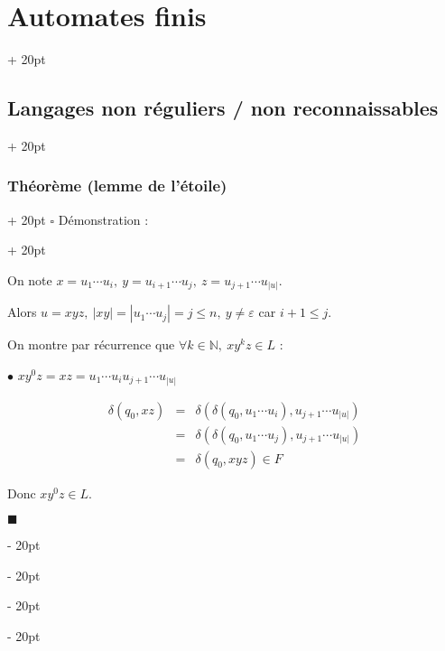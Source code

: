 \documentclass[a4paper, 12pt, twoside]{article}
\newcommand{\N}{\mathbb{N}} %
\newcommand{\abs}[1]{\left\lvert #1 \right\rvert}
\renewcommand{\le}{\leqslant}
\newcommand{\ind}[1][20pt]{\advance\leftskip + #1}
\newcommand{\deind}[1][20pt]{\advance\leftskip - #1}
\newenvironment{indt}[2][20pt]{#2 \par \ind[#1]}{\par \deind} %
\newenvironment{proof}[1][{Démonstration :}]{\begin{indt}{$\square$ #1}}{$\blacksquare$ \end{indt}}
\begin{document}
\begin{indt}{\section{Automates finis}}
\begin{indt}{\subsection{Langages non réguliers / non reconnaissables}}
\begin{indt}{\subsubsection{Théorème (lemme de l'étoile)}}
\begin{proof}
\begin{center}
                    \end{center}

                    On note $x = u_1 \cdots u_i,\ y = u_{i + 1} \cdots u_j,\ z = u_{j + 1} \cdots u_{\abs u}$.

                    Alors $u = xyz,\ \abs{xy} = \abs{u_1 \cdots u_j} = j \le n,\ y \neq \varepsilon$ car $i + 1 \le j$.

                    On montre par récurrence que $\forall k \in \N,\ xy^k z \in L$ :

                    \vspace{6pt}
                    
                    $\bullet$ $xy^0z = xz = u_1 \cdots u_i u_{j + 1} \cdots u_{\abs u}$

                    \[
                        \begin{array}{rcl}
                            \delta(q_0, xz)
                            &=& \delta(\delta(q_0, u_1 \cdots u_i), u_{j + 1} \cdots u_{\abs u})
                            \\
                            &=& \delta(\delta(q_0, u_1 \cdots u_j), u_{j + 1} \cdots u_{\abs u})
                            \\
                            &=& \delta(q_0, xyz) \in F
                        \end{array}
                    \]

                    Donc $xy^0 z \in L$.

                    \vspace{6pt}
                    

\end{proof}
\end{indt}
\end{indt}
\end{indt}
\end{document}
